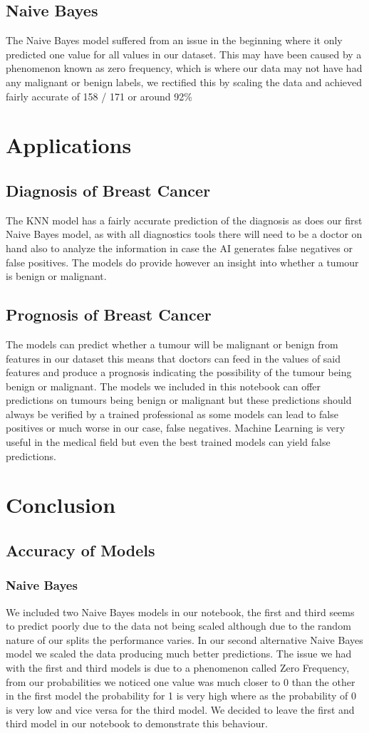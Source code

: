 \documentclass[conference]{IEEEtran}
\begin{document}
\subsection{Naive Bayes}
The Naive Bayes model suffered from an issue in the beginning where it only predicted one value for all values in our dataset.  This may have been caused by a phenomenon known as zero frequency, which is where our data may not have had any malignant or benign labels, we rectified this by scaling the data and achieved fairly accurate of 158 / 171 or around 92\%
\section{Applications}
\subsection{Diagnosis of Breast Cancer}
The KNN model has a fairly accurate prediction of the diagnosis as does our first Naive Bayes model, as with all diagnostics tools there will need to be a doctor on hand also to analyze the information in case the AI generates false negatives or false positives.  The models do provide however an insight into whether a tumour is benign or malignant.
\subsection{Prognosis of Breast Cancer}
The models can predict whether a tumour will be malignant or benign from features in our dataset this means that doctors can feed in the values of said features and produce a prognosis indicating the possibility of the tumour being benign or malignant.  The models we included in this notebook can offer predictions on tumours being benign or malignant but these predictions should always be verified by a trained professional as some models can lead to false positives or much worse in our case, false negatives.  Machine Learning is very useful in the medical field but even the best trained models can yield false predictions.
\section{Conclusion}
\subsection{Accuracy of Models}
\subsubsection{Naive Bayes}
We included two Naive Bayes models in our notebook, the first and third seems to predict poorly due to the data not being scaled although due to the random nature of our splits the performance varies.  In our second alternative Naive Bayes model we scaled the data producing much better predictions.  The issue we had with the first and third models is due to a phenomenon called Zero Frequency, from our probabilities we noticed one value was much closer to 0 than the other in the first model the probability for 1 is very high where as the probability of 0 is very low and vice versa for the third model.  We decided to leave the first and third model in our notebook to demonstrate this behaviour.
\end{document}
